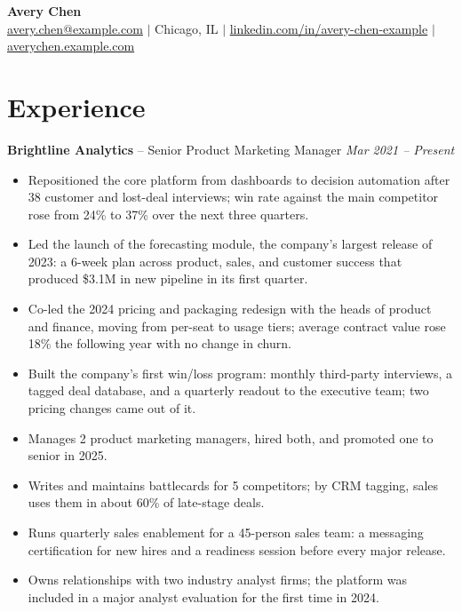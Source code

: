 \documentclass[11pt, letterpaper]{article}
\begin{document}
\pagestyle{empty}

\begin{center}
  \textbf{\LARGE Avery Chen} \\[2pt]
  \href{mailto:avery.chen@example.com}{avery.chen@example.com} $|$ Chicago, IL $|$ \href{https://linkedin.com/in/avery-chen-example}{linkedin.com/in/avery-chen-example} $|$ \href{https://averychen.example.com}{averychen.example.com}
\end{center}
\vspace{-15pt}

\section{Experience}

\textbf{Brightline Analytics} -- {Senior Product Marketing Manager}
\hfill \textit{Mar 2021 – Present}
\begin{itemize}
  \item Repositioned the core platform from dashboards to decision automation after 38 customer and lost-deal interviews; win rate against the main competitor rose from 24\% to 37\% over the next three quarters.
  \item Led the launch of the forecasting module, the company's largest release of 2023: a 6-week plan across product, sales, and customer success that produced \$3.1M in new pipeline in its first quarter.
  \item Co-led the 2024 pricing and packaging redesign with the heads of product and finance, moving from per-seat to usage tiers; average contract value rose 18\% the following year with no change in churn.
  \item Built the company's first win/loss program: monthly third-party interviews, a tagged deal database, and a quarterly readout to the executive team; two pricing changes came out of it.
  \item Manages 2 product marketing managers, hired both, and promoted one to senior in 2025.
  \item Writes and maintains battlecards for 5 competitors; by CRM tagging, sales uses them in about 60\% of late-stage deals.
  \item Runs quarterly sales enablement for a 45-person sales team: a messaging certification for new hires and a readiness session before every major release.
  \item Owns relationships with two industry analyst firms; the platform was included in a major analyst evaluation for the first time in 2024.
\end{itemize}
\end{document}
